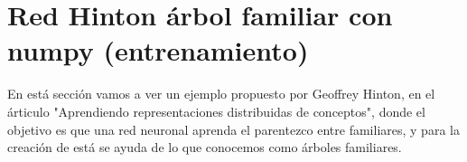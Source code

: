 \section{Red Hinton árbol familiar con numpy (entrenamiento)}

En está sección vamos a ver un ejemplo propuesto por Geoffrey Hinton, en el árticulo "Aprendiendo representaciones distribuidas de conceptos", donde el objetivo es que una red neuronal aprenda el parentezco entre familiares, y para la creación de está se ayuda de lo que conocemos como árboles familiares.
